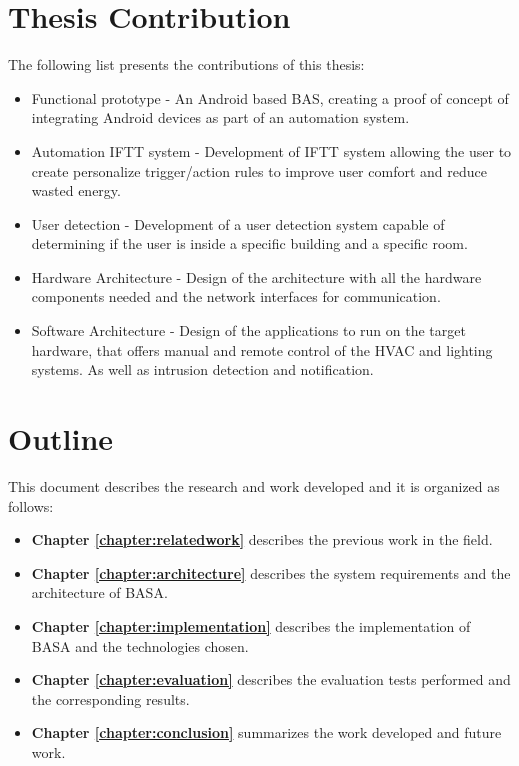 \section{Thesis Contribution}
\label{section:contribution}

The following list presents the contributions of this thesis:

\begin{itemize}
	\item Functional prototype - An Android based \ac{BAS}, creating a 	proof of concept of integrating Android devices as part of an automation system.

	\item Automation \ac{IFTT} system - Development of \ac{IFTT} system allowing the user to create personalize trigger/action rules to improve user comfort and reduce wasted energy.
	
	\item User detection - Development of a user detection system capable of determining if the user is inside a specific building and a specific room. 

    \item Hardware Architecture - Design of the architecture with all the hardware components needed and the network interfaces for communication.
    
    \item Software Architecture - Design of the applications to run on the target hardware, that offers manual and remote control of the \ac{HVAC} and lighting systems. As well as intrusion detection and notification.
%    
    
\end{itemize}

\section{Outline}
This document describes the research and work developed and it is organized as follows:

\begin{itemize}

\item \textbf{Chapter \ref{chapter:relatedwork}} describes the previous work in the field.
\item \textbf{Chapter \ref{chapter:architecture}} describes the system requirements and the architecture of BASA.
\item \textbf{Chapter \ref{chapter:implementation}} describes the implementation of BASA and the technologies chosen.
\item \textbf{Chapter \ref{chapter:evaluation}} describes the evaluation tests performed and the corresponding results.
\item \textbf{Chapter \ref{chapter:conclusion}} summarizes the work developed and future work.
\end{itemize}

\cleardoublepage
